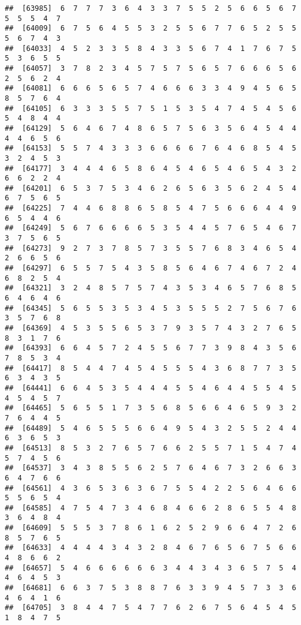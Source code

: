 \documentclass[
]{book}
\begin{document}
\begin{verbatim}
##  [63985]  6  7  7  7  3  6  4  3  3  7  5  5  2  5  6  6  5  6  7  5  5  5  4  7
##  [64009]  6  7  5  6  4  5  5  3  2  5  5  6  7  7  6  5  2  5  5  5  6  7  4  3
##  [64033]  4  5  2  3  3  5  8  4  3  3  5  6  7  4  1  7  6  7  5  5  3  6  5  5
##  [64057]  3  7  8  2  3  4  5  7  5  7  5  6  5  7  6  6  6  5  6  2  5  6  2  4
##  [64081]  6  6  6  5  6  5  7  4  6  6  6  3  3  4  9  4  5  6  5  8  5  7  6  4
##  [64105]  6  3  3  3  5  5  7  5  1  5  3  5  4  7  4  5  4  5  6  5  4  8  4  4
##  [64129]  5  6  4  6  7  4  8  6  5  7  5  6  3  5  6  4  5  4  4  4  4  6  5  6
##  [64153]  5  5  7  4  3  3  3  6  6  6  6  7  6  4  6  8  5  4  5  3  2  4  5  3
##  [64177]  3  4  4  4  6  5  8  6  4  5  4  6  5  4  6  5  4  3  2  6  6  2  2  4
##  [64201]  6  5  3  7  5  3  4  6  2  6  5  6  3  5  6  2  4  5  4  6  7  5  6  5
##  [64225]  7  4  4  6  8  8  6  5  8  5  4  7  5  6  6  6  4  4  9  6  5  4  4  6
##  [64249]  5  6  7  6  6  6  6  5  3  5  4  4  5  7  6  5  4  6  7  3  7  5  6  5
##  [64273]  9  2  7  3  7  8  5  7  3  5  5  7  6  8  3  4  6  5  4  2  6  6  5  6
##  [64297]  6  5  5  7  5  4  3  5  8  5  6  4  6  7  4  6  7  2  4  6  8  2  5  4
##  [64321]  3  2  4  8  5  7  5  7  4  3  5  3  4  6  5  7  6  8  5  6  4  6  4  6
##  [64345]  5  6  5  5  3  5  3  4  5  3  5  5  5  2  7  5  6  7  6  3  5  7  6  8
##  [64369]  4  5  3  5  5  6  5  3  7  9  3  5  7  4  3  2  7  6  5  8  3  1  7  6
##  [64393]  6  6  4  5  7  2  4  5  5  6  7  7  3  9  8  4  3  5  6  7  8  5  3  4
##  [64417]  8  5  4  4  7  4  5  4  5  5  5  4  3  6  8  7  7  3  5  6  3  4  3  5
##  [64441]  6  6  4  5  3  5  4  4  4  5  5  4  6  4  4  5  5  4  5  4  5  4  5  7
##  [64465]  5  6  5  5  1  7  3  5  6  8  5  6  6  4  6  5  9  3  2  7  6  4  4  5
##  [64489]  5  4  6  5  5  5  6  6  4  9  5  4  3  2  5  5  2  4  4  6  3  6  5  3
##  [64513]  8  5  3  2  7  6  5  7  6  6  2  5  5  7  1  5  4  7  4  5  7  4  5  6
##  [64537]  3  4  3  8  5  5  6  2  5  7  6  4  6  7  3  2  6  6  3  6  4  7  6  6
##  [64561]  4  3  6  5  3  6  3  6  7  5  5  4  2  2  5  6  4  6  6  5  5  6  5  4
##  [64585]  4  7  5  4  7  3  4  6  8  4  6  6  2  8  6  5  5  4  8  3  6  4  8  4
##  [64609]  5  5  5  3  7  8  6  1  6  2  5  2  9  6  6  4  7  2  6  8  5  7  6  5
##  [64633]  4  4  4  4  3  4  3  2  8  4  6  7  6  5  6  7  5  6  6  4  8  6  6  2
##  [64657]  5  4  6  6  6  6  6  6  3  4  4  3  4  3  6  5  7  5  4  4  6  4  5  3
##  [64681]  6  6  3  7  5  3  8  8  7  6  3  3  9  4  5  7  3  3  6  4  6  4  1  6
##  [64705]  3  8  4  4  7  5  4  7  7  6  2  6  7  5  6  4  5  4  5  1  8  4  7  5

\end{verbatim}
\end{document}
